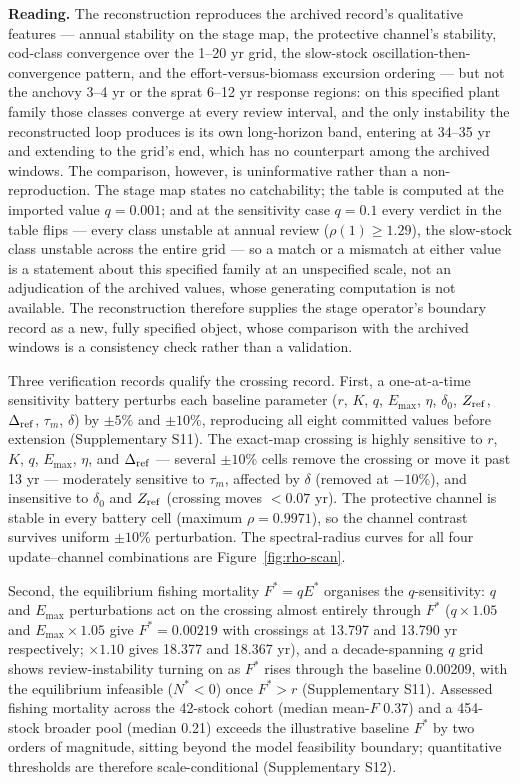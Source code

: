 \documentclass[11pt]{article}
\begin{document}
\textbf{Reading.} The reconstruction reproduces the archived record's
qualitative features --- annual stability on the stage map, the
protective channel's stability, cod-class convergence over the 1--20 yr
grid, the slow-stock oscillation-then-convergence pattern, and the
effort-versus-biomass excursion ordering --- but not the anchovy 3--4 yr
or the sprat 6--12 yr response regions: on this specified plant family
those classes converge at every review interval, and the only
instability the reconstructed loop produces is its own long-horizon
band, entering at 34--35 yr and extending to the grid's end, which has
no counterpart among the archived windows. The comparison, however, is
uninformative rather than a non-reproduction. The stage map states no
catchability; the table is computed at the imported value \(q = 0.001\);
and at the sensitivity case \(q = 0.1\) every verdict in the table
flips --- every class unstable at annual review (\(\rho(1) \ge 1.29\)),
the slow-stock class unstable across the entire grid --- so a match or a
mismatch at either value is a statement about this specified family at an
unspecified scale, not an adjudication of the archived values, whose
generating computation is not available. The reconstruction therefore
supplies the stage operator's boundary record as a new, fully specified
object, whose comparison with the archived windows is a consistency
check rather than a validation.

Three verification records qualify the crossing record. First, a one-at-a-time sensitivity battery perturbs each baseline parameter (\(r\), \(K\), \(q\), \(E_{\max}\), \(\eta\), \(\delta_0\), \(Z_{\rm ref}\), \(\Delta_{\rm ref}\), \(\tau_m\), \(\delta\)) by \(\pm 5\%\) and \(\pm 10\%\), reproducing all eight committed values before extension (Supplementary S11). The exact-map crossing is highly sensitive to \(r\), \(K\), \(q\), \(E_{\max}\), \(\eta\), and \(\Delta_{\rm ref}\) --- several \(\pm 10\%\) cells remove the crossing or move it past 13 yr --- moderately sensitive to \(\tau_m\), affected by \(\delta\) (removed at \(-10\%\)), and insensitive to \(\delta_0\) and \(Z_{\rm ref}\) (crossing moves \(< 0.07\) yr). The protective channel is stable in every battery cell (maximum \(\rho = 0.9971\)), so the channel contrast survives uniform \(\pm 10\%\) perturbation. The spectral-radius curves for all four update--channel combinations are Figure~\ref{fig:rho-scan}.

Second, the equilibrium fishing mortality \(F^* = qE^*\) organises the \(q\)-sensitivity: \(q\) and \(E_{\max}\) perturbations act on the crossing almost entirely through \(F^*\) (\(q \times 1.05\) and \(E_{\max} \times 1.05\) give \(F^* = 0.00219\) with crossings at 13.797 and 13.790 yr respectively; \(\times 1.10\) gives 18.377 and 18.367 yr), and a decade-spanning \(q\) grid shows review-instability turning on as \(F^*\) rises through the baseline 0.00209, with the equilibrium infeasible (\(N^*<0\)) once \(F^*>r\) (Supplementary S11). Assessed fishing mortality across the 42-stock cohort (median mean-\(F\) 0.37) and a 454-stock broader pool (median 0.21) exceeds the illustrative baseline \(F^*\) by two orders of magnitude, sitting beyond the model feasibility boundary; quantitative thresholds are therefore scale-conditional (Supplementary S12).
\end{document}

